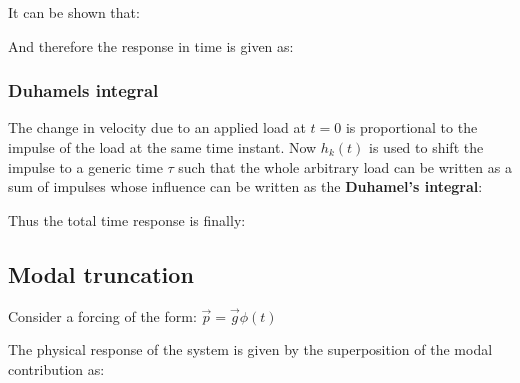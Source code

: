 \documentclass[10pt,a4paper]{scrartcl}
\begin{document}
\begin{multicols*}{2}

It can be shown that:


And therefore the response in time is given as:


\subsubsection{Duhamels integral}


The change in velocity due to an applied load at $t=0$ is proportional to the impulse of the load at the same time instant. Now $h_k(t)$ is used to shift the impulse to a generic time $\tau$ such that the whole arbitrary load can be written as a sum of impulses whose influence can be written as the \textbf{Duhamel's integral}:



Thus the total time response is finally:


\subsection{Modal truncation}

Consider a forcing of the form: $\vec{p}=\vec{g}\phi(t)$

The physical response of the system is given by the superposition of the modal contribution as:



\end{multicols*}
\end{document}
